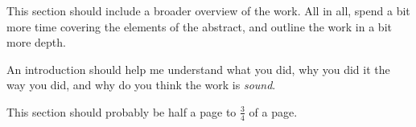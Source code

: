 This section should include a broader overview of the work. All in all, spend a
bit more time covering the elements of the abstract, and outline the work in a bit more depth.

An introduction should help me understand what you did, why you did it the way
you did, and why do you think the work is \emph{sound}.

This section should probably be half a page to $\frac{3}{4}$ of a page.
